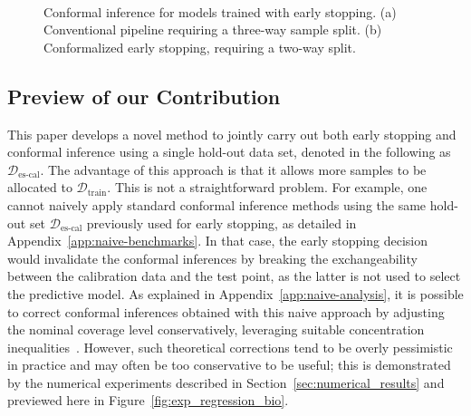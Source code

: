 \begin{figure}[!htb]
  \centering
  ~~~~~
  \caption{Conformal inference for models trained with early stopping. (a) Conventional pipeline requiring a three-way sample split. (b) Conformalized early stopping, requiring a two-way split.}
  \label{fig:ces_data_splitting}
\end{figure}


\subsection{Preview of our Contribution}

This paper develops a novel method to jointly carry out both early stopping and conformal inference using a single hold-out data set, denoted in the following as  $\mathcal{D}_{\text{es-cal}}$. The advantage of this approach is that it allows more samples to be allocated to  $\mathcal{D}_{\text{train}}$.
This is not a straightforward problem. For example, one cannot naively apply standard conformal inference methods using the same hold-out set $\mathcal{D}_{\text{es-cal}}$ previously used for early stopping, as detailed in Appendix~\ref{app:naive-benchmarks}.
In that case, the early stopping decision would invalidate the conformal inferences by breaking the exchangeability between the calibration data and the test point, as the latter is not used to select the predictive model.
As explained in Appendix~\ref{app:naive-analysis}, it is possible to correct conformal inferences obtained with this naive approach by adjusting the nominal coverage level conservatively, leveraging suitable concentration inequalities~\cite{efficiency_first_cp}. However, such theoretical corrections tend to be overly pessimistic in practice and may often be too conservative to be useful; this is demonstrated by the numerical experiments described in Section~\ref{sec:numerical_results} and previewed here in Figure~\ref{fig:exp_regression_bio}.

